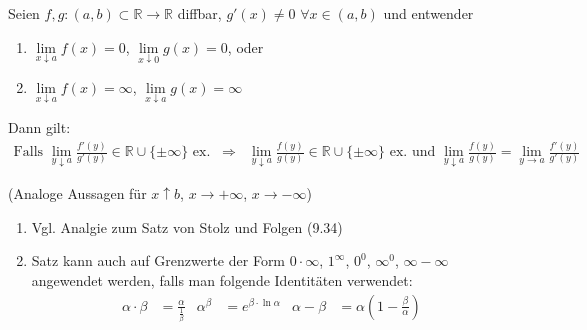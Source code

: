 \begin{proposition}
	Seien $f,g:(a,b)\subset\mathbb{R}\to\mathbb{R}$ \gls{diffbar}, $g'(x) \neq 0$ $\forall x\in(a,b)$ und entwender
	\begin{enumerate}[label={\roman*)}]
		\item $\lim\limits_{x\downarrow a} f(x) = 0$, $\lim\limits_{x\downarrow 0} g(x) = 0$, oder
		\item $\lim\limits_{x\downarrow a} f(x) =\infty$, $\lim\limits_{x\downarrow a} g(x) = \infty$
	\end{enumerate}

	Dann gilt:
	\begin{align}
		\text{Falls $\lim\limits_{y\downarrow a} \frac{f'(y)}{g'(y)} \in\mathbb{R}\cup \{ \pm\infty \}$ ex.} \;\; \Rightarrow \;\; \lim\limits_{y\downarrow a} \frac{f(y)}{g(y)} \in\mathbb{R}\cup \{ \pm\infty \}\text{ ex. und }\lim\limits_{y\downarrow a} \frac{f(y)}{g(y)} = \lim\limits_{y\to a} \frac{f'(y)}{g'(y)}
	\end{align}
	
	(Analoge Aussagen für $x\uparrow b$, $x\to +\infty$, $x\to-\infty$)
\end{proposition}

\begin{remark}
	\vspace*{0pt}
	\begin{enumerate}[label={\arabic*)},topsep=\dimexpr-\baselineskip/2\relax]
		\item Vgl. Analgie zum Satz von Stolz und Folgen (9.34)
		\item Satz kann auch auf Grenzwerte der Form $0\cdot \infty$, $1^{\infty}$, $0^0$, $\infty^0$, $\infty - \infty$ angewendet werden, falls man folgende Identitäten verwendet: \begin{align*}
			\alpha\cdot\beta &= \frac{\alpha}{\frac{1}{\beta}} & \alpha^\beta &= e^{\beta \cdot \ln \alpha} & \alpha - \beta &= \alpha \left( 1 - \frac{\beta}{\alpha} \right)
		\end{align*}
	\end{enumerate}
\end{remark}

